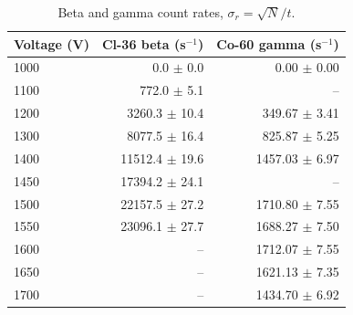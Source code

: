 \begin{table}[htbp]
\centering
\caption{Beta and gamma count rates, $\sigma_r=\sqrt{N}/t$.}
\label{tab:bg-rates}
\begin{tabular}{lrr}
\toprule
Voltage (V) & Cl-36 beta (s$^{-1}$) & Co-60 gamma (s$^{-1}$) \\
\midrule
1000 & 0.0 $\pm$ 0.0 & 0.00 $\pm$ 0.00 \\
1100 & 772.0 $\pm$ 5.1 & -- \\
1200 & 3260.3 $\pm$ 10.4 & 349.67 $\pm$ 3.41 \\
1300 & 8077.5 $\pm$ 16.4 & 825.87 $\pm$ 5.25 \\
1400 & 11512.4 $\pm$ 19.6 & 1457.03 $\pm$ 6.97 \\
1450 & 17394.2 $\pm$ 24.1 & -- \\
1500 & 22157.5 $\pm$ 27.2 & 1710.80 $\pm$ 7.55 \\
1550 & 23096.1 $\pm$ 27.7 & 1688.27 $\pm$ 7.50 \\
1600 & -- & 1712.07 $\pm$ 7.55 \\
1650 & -- & 1621.13 $\pm$ 7.35 \\
1700 & -- & 1434.70 $\pm$ 6.92 \\
\bottomrule
\end{tabular}
\end{table}
